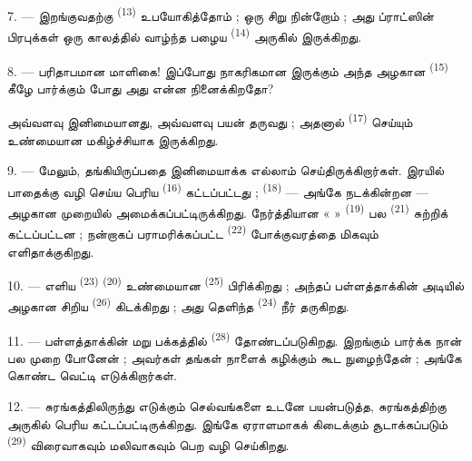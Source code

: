 7. --- இறங்குவதற்கு  \textsuperscript{(13)}
உபயோகித்தோம் ; ஒரு சிறு  நின்றோம் ; அது
ப்ராட்ஸின் பிரபுக்கள் ஒரு காலத்தில் வாழ்ந்த பழைய   \textsuperscript{(14)} அருகில்
இருக்கிறது.

8. --- பரிதாபமான மாளிகை! இப்போது நாகரிகமான  இருக்கும் அந்த அழகான 
\textsuperscript{(15)} கீழே பார்க்கும் போது அது என்ன நினைக்கிறதோ?

 அவ்வளவு இனிமையானது,  அவ்வளவு
பயன் தருவது ; அதனால்  \textsuperscript{(17)}
செய்யும்  உண்மையான மகிழ்ச்சியாக இருக்கிறது.

\VUsaut{3.0mm}
\VUsaut{3.0mm}

9. --- மேலும், தங்கியிருப்பதை இனிமையாக்க எல்லாம் செய்திருக்கிறார்கள்.
இரயில் பாதைக்கு வழி செய்ய பெரிய  \textsuperscript{(16)}
கட்டப்பட்டது ;  
\textsuperscript{(18)} — அங்கே  நடக்கின்றன —
அழகான முறையில் அமைக்கப்பட்டிருக்கிறது. நேர்த்தியான «  »
\textsuperscript{(19)} பல 
\textsuperscript{(21)} சுற்றிக் கட்டப்பட்டன ; நன்றாகப் பராமரிக்கப்பட்ட
 \textsuperscript{(22)} போக்குவரத்தை மிகவும்
எளிதாக்குகிறது.

10. --- எளிய  \textsuperscript{(23)} 
\textsuperscript{(20)} உண்மையான 
\textsuperscript{(25)} பிரிக்கிறது ; அந்தப் பள்ளத்தாக்கின் அடியில்
அழகான சிறிய  \textsuperscript{(26)} கிடக்கிறது ; அது
தெளிந்த  \textsuperscript{(24)} நீர் தருகிறது.

11. --- பள்ளத்தாக்கின் மறு பக்கத்தில் 
\textsuperscript{(28)} தோண்டப்படுகிறது. 
இறங்கும்  பார்க்க நான் பல முறை
போனேன் ; அவர்கள் தங்கள் நாளைக் கழிக்கும் 
கூட நுழைந்தேன் ; அங்கே  கொண்ட 
வெட்டி எடுக்கிறார்கள்.

12. --- சுரங்கத்திலிருந்து எடுக்கும் செல்வங்களை உடனே பயன்படுத்த,
சுரங்கத்திற்கு அருகில் பெரிய 
கட்டப்பட்டிருக்கிறது. இங்கே ஏராளமாகக் கிடைக்கும் 
சூடாக்கப்படும்  \textsuperscript{(29)}
 விரைவாகவும் மலிவாகவும் பெற வழி செய்கிறது.

